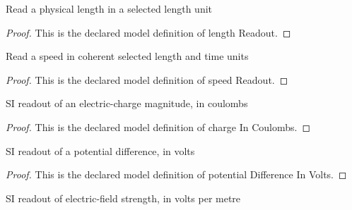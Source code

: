 \begin{definition}
  \label{def:physics:phyx-mini-0639:phyxminiproblems-problemphyxmini0639-lengthreadout}
  Read a physical length in a selected length unit
\end{definition}
\begin{proof}
  This is the declared model definition of length Readout.
\end{proof}
\begin{definition}
  \label{def:physics:phyx-mini-0639:phyxminiproblems-problemphyxmini0639-speedreadout}
  Read a speed in coherent selected length and time units
\end{definition}
\begin{proof}
  This is the declared model definition of speed Readout.
\end{proof}
\begin{definition}
  \label{def:physics:phyx-mini-0639:phyxminiproblems-problemphyxmini0639-chargeincoulombs}
  SI readout of an electric-charge magnitude, in coulombs
\end{definition}
\begin{proof}
  This is the declared model definition of charge In Coulombs.
\end{proof}
\begin{definition}
  \label{def:physics:phyx-mini-0639:phyxminiproblems-problemphyxmini0639-potentialdifferenceinvolts}
  SI readout of a potential difference, in volts
\end{definition}
\begin{proof}
  This is the declared model definition of potential Difference In Volts.
\end{proof}
\begin{definition}
  \label{def:physics:phyx-mini-0639:phyxminiproblems-problemphyxmini0639-electricfieldstrengthinvoltspermeter}
  SI readout of electric-field strength, in volts per metre
\end{definition}
